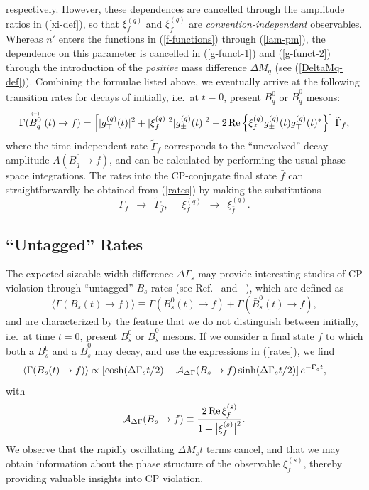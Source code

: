 \documentclass[11pt]{cernrep}
\begin{document}
respectively. However, these dependences are cancelled through the 
amplitude ratios in (\ref{xi-def}), so that $\xi_f^{(q)}$ and 
$\xi_{\bar f}^{(q)}$ are {\it convention-independent} observables. 
Whereas $n'$ enters the functions in (\ref{f-functions}) through 
(\ref{lam-pm}), the dependence on this parameter is cancelled in 
(\ref{g-funct-1}) and (\ref{g-funct-2}) through the introduction of 
the {\it positive} mass difference $\Delta M_q$ (see (\ref{DeltaMq-def})). 
Combining the formulae listed above, we eventually arrive at the 
following transition rates for decays of initially, i.e.\ at $t=0$, 
present $B^0_q$ or $\bar B^0_q$ mesons:
\begin{equation}\label{rates}
\Gamma(\stackrel{{\mbox{\tiny (--)}}}{B^0_q}(t)\to f)
=\left[|g_\mp^{(q)}(t)|^2+|\xi_f^{(q)}|^2|g_\pm^{(q)}(t)|^2-
2\mbox{\,Re}\left\{\xi_f^{(q)}
g_\pm^{(q)}(t)g_\mp^{(q)}(t)^\ast\right\}
\right]\tilde\Gamma_f,
\end{equation}
where the time-independent rate $\tilde\Gamma_f$ corresponds to the 
``unevolved'' decay amplitude $A(B^0_q\to f)$, and can be calculated by 
performing the usual phase-space integrations. The rates into the 
CP-conjugate final state $\bar f$ can straightforwardly be obtained from 
(\ref{rates}) by making the substitutions
\begin{equation}
\tilde\Gamma_f  \,\,\,\to\,\,\, 
\tilde\Gamma_{\bar f},
\quad\,\,\xi_f^{(q)} \,\,\,\to\,\,\, 
\xi_{\bar f}^{(q)}.
\end{equation}

%
%
%
\subsection{``Untagged'' Rates}
%
%
%
The expected sizeable width difference $\Delta\Gamma_s$ may provide interesting studies of CP 
violation through ``untagged'' $B_s$ rates 
(see Ref.~\cite{DDF} and \cite{dun}--\cite{DFN}), which are defined as 
\begin{equation}
\langle\Gamma(B_s(t)\to f)\rangle
\equiv\Gamma(B^0_s(t)\to f)+\Gamma(\bar B^0_s(t)\to f),
\end{equation}
and are characterized by the feature that we do not distinguish between
initially, i.e.\ at time $t=0$, present $B^0_s$ or $\bar B^0_s$ mesons. 
If we consider a final state $f$ to which both a $B^0_s$ and a $\bar B^0_s$ 
may decay, and use the expressions in (\ref{rates}), we find
\begin{equation}\label{untagged-rate}
\hspace*{-0.7truecm}\langle\Gamma(B_s(t)\to f)\rangle
\propto \left[\cosh(\Delta\Gamma_st/2)-{\cal A}_{\Delta\Gamma}(B_s\to f)
\sinh(\Delta\Gamma_st/2)\right]e^{-\Gamma_s t},
\end{equation}
with
\begin{equation}\label{ADGam}
{\cal A}_{\rm \Delta\Gamma}(B_s\to f)\equiv
\frac{2\,\mbox{Re}\,\xi^{(s)}_f}{1+\bigl|\xi^{(s)}_f
\bigr|^2}.
\end{equation}
We observe that the rapidly oscillating 
$\Delta M_st$ terms cancel, and that we may obtain information about the 
phase structure of the observable $\xi_f^{(s)}$, thereby providing valuable
insights into CP violation. 
\end{document}
